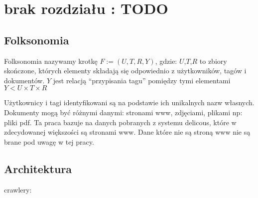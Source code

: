 \chapter{brak rozdziału : TODO}
\section{Folksonomia}

Folksonomia nazywamy krotkę $F := (U,T,R,Y)$, gdzie:
$U$,$T$,$R$ to zbiory skończone, których elementy składają się odpowiednio z użytkowników, tagów i dokumentów. $Y$ jest relacją “przypisania tagu” pomiędzy tymi elementami $Y < U \times T \times R$

Użytkownicy i tagi identyfikowani są na podstawie ich unikalnych nazw własnych. Dokumenty mogą być różnymi danymi: stronami www, zdjęciami, plikami np: pliki pdf. Ta praca bazuje na danych pobranych z systemu delicous, które w zdecydowanej większości są stronami www. Dane które nie są stroną www nie są brane pod uwagę w tej pracy. 

\section{Architektura}

crawlery:

